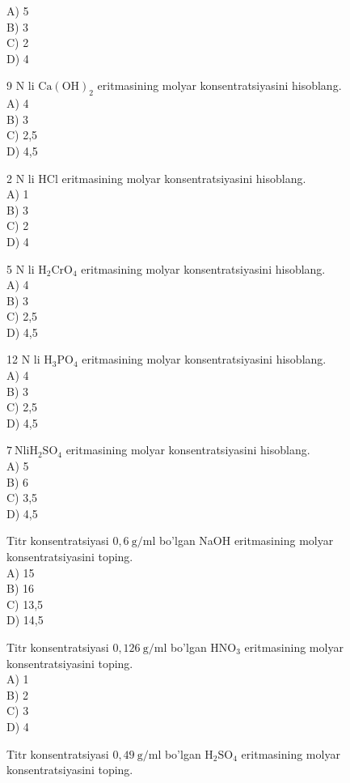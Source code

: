 A) 5\\
B) 3\\
C) 2\\
D) 4
  \item 9 N li $\mathrm{Ca}(\mathrm{OH})_{2}$ eritmasining molyar konsentratsiyasini hisoblang.\\
A) 4\\
B) 3\\
C) 2,5\\
D) 4,5
  \item 2 N li HCl eritmasining molyar konsentratsiyasini hisoblang.\\
A) 1\\
B) 3\\
C) 2\\
D) 4
  \item 5 N li $\mathrm{H}_{2} \mathrm{CrO}_{4}$ eritmasining molyar konsentratsiyasini hisoblang.\\
A) 4\\
B) 3\\
C) 2,5\\
D) 4,5
  \item 12 N li $\mathrm{H}_{3} \mathrm{PO}_{4}$ eritmasining molyar konsentratsiyasini hisoblang.\\
A) 4\\
B) 3\\
C) 2,5\\
D) 4,5
  \item $7 \mathrm{~N} \mathrm{li} \mathrm{H}_{2} \mathrm{SO}_{4}$ eritmasining molyar konsentratsiyasini hisoblang.\\
A) 5\\
B) 6\\
C) 3,5\\
D) 4,5
  \item Titr konsentratsiyasi $0,6 \mathrm{~g} / \mathrm{ml}$ bo'lgan NaOH eritmasining molyar konsentratsiyasini toping.\\
A) 15\\
B) 16\\
C) 13,5\\
D) 14,5
  \item Titr konsentratsiyasi $0,126 \mathrm{~g} / \mathrm{ml}$ bo'lgan $\mathrm{HNO}_{3}$ eritmasining molyar konsentratsiyasini toping.\\
A) 1\\
B) 2\\
C) 3\\
D) 4
  \item Titr konsentratsiyasi $0,49 \mathrm{~g} / \mathrm{ml}$ bo'lgan $\mathrm{H}_{2} \mathrm{SO}_{4}$ eritmasining molyar konsentratsiyasini toping.\\
